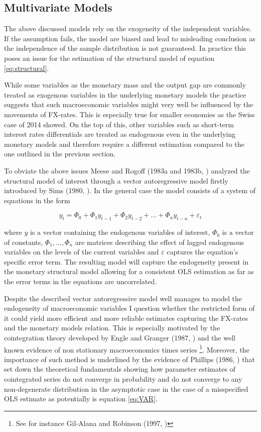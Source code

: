 \subsection{Multivariate Models}
\label{sub:multivariate}
The above discussed models rely on the exogeneity of the independent
variables. If the assumption fails, the model are biased and lead to
misleading conclusion as the independence of the sample distribution
is not guaranteed. In practice this poses an issue for the estimation
of the structural model of equation \ref{eq:structural}.

While some variables as the monetary mass and the output gap are
commonly treated as exogenous variables in the underlying monetary
models the practice suggests that such macroeconomic variables might
very well be influenced by the movements of FX-rates. This is
especially true for smaller economies as the Swiss case of 2014
showed. On the top of this, other variables such as short-term interest
rates differentials are treated as endogenous even in the underlying
monetary models and therefore require a different estimation compared
to the one outlined in the previous section.

To obviate the above issues Meese and Rogoff (1983a and 1983b,
\cite{MeeseRogoffa, MeeseRogoffb}) analyzed the structural model of
interest through a vector autoregressive model firstly introduced by
Sims (1980, \cite{Sims1980}).  In the general case the model consists
of a system of equations in the form

\begin{equation} \label{eq:VAR}
y_{t} =  \Phi_{0}+ \Phi_{1}y_{t-1} + \Phi_{2}y_{t-2} + \dots + \Phi_{n}y_{t-n} + \varepsilon_{t}
\end{equation}

where $y$ is a vector containing the endogenous variables of interest,
$\Phi_0$ is a vector of constants, $\Phi_1, \dots , \Phi_n$ are
matrices describing the effect of lagged endogenous variables on the
levels of the current variables and $\varepsilon$ captures the
equation's specific error term.  The resulting model will capture the
endogeneity present in the monetary structural model allowing for a
consistent OLS estimation as far as the error terms in the equations
are uncorrelated.

Despite the described vector autoregressive model well manages to
model the endogeneity of macroeconomic variables I question whether
the restricted form of it could yield more efficient and more reliable
estimates capturing the FX-rates and the monetary models
relation. This is especially motivated by the cointegration theory
developed by Engle and Granger (1987, \cite{EngleGranger}) and the
well known evidence of non stationary macroeconomics times series
\footnote{See for instance Gil-Alana and Robinson (1997,
  \cite{GilAlanaRobinson})}. Moreover, the importance of such method
is underlined by the evidence of Phillips (1986, \cite{Phillips}) that
set down the theoretical fundamentals showing how parameter estimates
of cointegrated series do not converge in probability and do not
converge to any non-degenerate distribution in the asymptotic case in
the case of a misspecified OLS estimate as potentially is equation
\ref{eq:VAR}.

